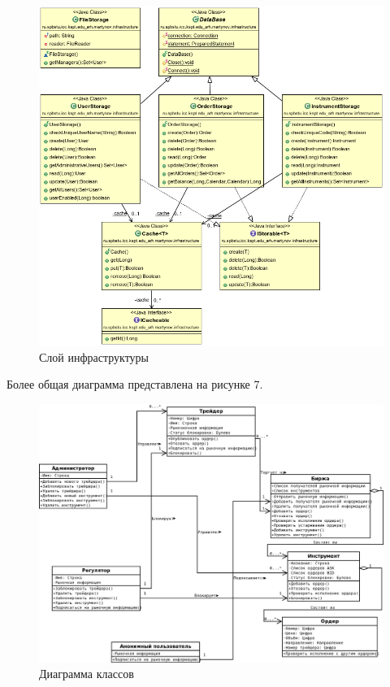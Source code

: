\documentclass[a4paper, 12pt]{article}        %
\begin{document}
\begin{figure}[H]
\centering
\includegraphics[scale=0.65]{res/pic06}
\caption{Слой инфраструктуры}
\end{figure}

Более общая диаграмма представлена на рисунке 7.

\begin{figure}[H]
\centering
\includegraphics[scale=0.43]{res/pic07}
\caption{Диаграмма классов}
\end{figure}
\end{document}
